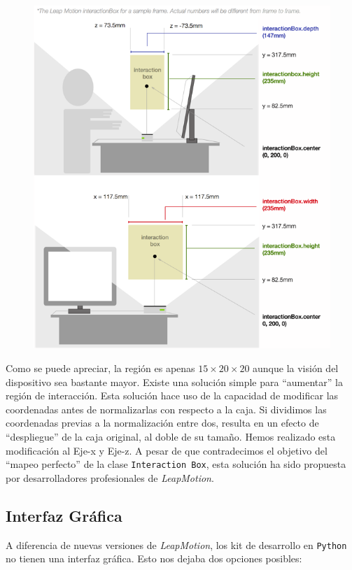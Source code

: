 \documentclass[11pt,a4paper]{article}
\begin{document}
\begin{figure}[H]
\centering
\includegraphics[scale=0.5]{img/box.png}
\end{figure}

Como se puede apreciar, la región es apenas $15 \times 20 \times 20$ aunque la visión del dispositivo sea bastante mayor. 
Existe una solución simple para “aumentar” la región de interacción. Esta solución hace uso de la capacidad de modificar las coordenadas antes de normalizarlas con respecto a la caja. Si dividimos las coordenadas previas a la normalización entre dos, resulta en un efecto de ``despliegue'' de la caja original, al doble de su tamaño. 
Hemos realizado esta modificación al Eje-x y Eje-z. A pesar de que contradecimos el objetivo del ``mapeo perfecto'' de la clase \texttt{Interaction Box}, esta solución ha sido propuesta por desarrolladores profesionales de \textit{LeapMotion}.

\subsection{Interfaz Gráfica}

A diferencia de nuevas versiones de \textit{LeapMotion}, los kit de desarrollo en \texttt{Python} no tienen una interfaz gráfica. Esto nos dejaba dos opciones posibles:
\end{document}
